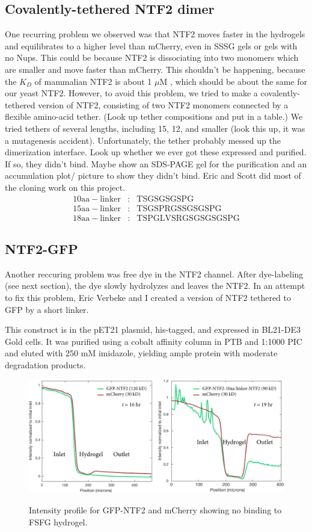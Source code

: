 \subsection{Covalently-tethered NTF2 dimer}
One recurring problem we observed was that NTF2 moves faster in the hydrogels and equilibrates to a higher level than mCherry, even in SSSG gels or gels with no Nups.  This could be because NTF2 is dissociating into two monomers which are smaller and move faster than mCherry.  This shouldn't be happening, because the $K_D$ of mammalian NTF2 is about 1 $\mu$M \cite{chaillan-huntington01}, which should be about the same for our yeast NTF2.  However, to avoid this problem, we tried to make a covalently-tethered version of NTF2, consisting of two NTF2 monomers connected by a flexible amino-acid tether.  (Look up tether compositions and put in a table.)  We tried tethers of several lengths, including 15, 12, and smaller (look this up, it was a mutagenesis accident).  Unfortunately, the tether probably messed up the dimerization interface.  Look up whether we ever got these expressed and purified.  If so, they didn't bind.  Maybe show an SDS-PAGE gel for the purification and an accumulation plot/ picture to show they didn't bind. Eric and Scott did most of the cloning work on this project.
\begin{align*}
\mathrm{10aa-linker}&:&\mathrm{TSGSGSGSPG}\\
\mathrm{15aa-linker}&:&\mathrm{TSGSPRGSSGSGSPG}\\
\mathrm{18aa-linker}&:&\mathrm{TSPGLVSRGSGSGSGSPG}
\end{align*}
\subsection{NTF2-GFP}

Another reccuring problem was free dye in the NTF2 channel.  After dye-labeling (see next section), the dye slowly hydrolyzes and leaves the NTF2.  In an attempt to fix this problem, Eric Verbeke and I created a version of NTF2 tethered to GFP by a short linker.  

This construct is in the pET21 plasmid, his-tagged, and expressed in BL21-DE3 Gold cells.  It was purified using a cobalt affinity column in PTB and 1:1000 PIC and eluted with 250 mM imidazole, yielding ample protein with moderate degradation products.


\begin{figure} %
\caption{Intensity profile for GFP-NTF2 and mCherry showing no binding to FSFG hydrogel.}
\centering
\includegraphics[width=\textwidth]{figs/ch03/GFP-NTF2-attempts.pdf}
\label{fig:GFP-NTF2}
\end{figure} 
